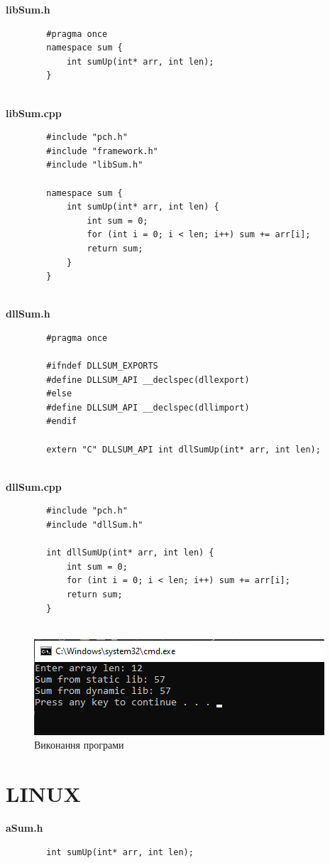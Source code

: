 \documentclass{article}
\begin{document}
\begin{normalsize}
	\noindent\textbf{libSum.h}
	\begin{lstlisting}
		#pragma once
		namespace sum {
			int sumUp(int* arr, int len);
		}
		
	\end{lstlisting}

	\noindent\textbf{libSum.cpp}
	\begin{lstlisting}
		#include "pch.h"
		#include "framework.h"
		#include "libSum.h"
		
		namespace sum {
			int sumUp(int* arr, int len) {
				int sum = 0;
				for (int i = 0; i < len; i++) sum += arr[i];
				return sum;
			}
		}
		
	\end{lstlisting}
	
	\noindent\textbf{dllSum.h}
	\begin{lstlisting}
		#pragma once
		
		#ifndef DLLSUM_EXPORTS
		#define DLLSUM_API __declspec(dllexport)
		#else
		#define DLLSUM_API __declspec(dllimport)
		#endif
		
		extern "C" DLLSUM_API int dllSumUp(int* arr, int len);
		
	\end{lstlisting}
		
	\noindent\textbf{dllSum.cpp}
	\begin{lstlisting}
		#include "pch.h"
		#include "dllSum.h"
		
		int dllSumUp(int* arr, int len) {
			int sum = 0;
			for (int i = 0; i < len; i++) sum += arr[i];
			return sum;
		}
		
	\end{lstlisting}
	
	\begin{figure}[H]
		\centering
		\includegraphics[scale=0.9]{1}
		\caption{Виконання програми}
	\end{figure}

	\section*{LINUX}
	\textbf{aSum.h}
	\begin{lstlisting}
		int sumUp(int* arr, int len);
	

\end{lstlisting}
\end{normalsize}
\end{document}
